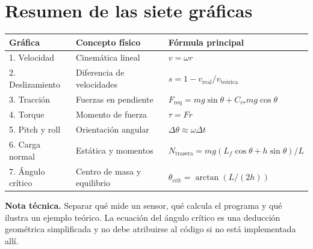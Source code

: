 \documentclass[12pt,a4paper]{article}
\begin{document}
\section*{Resumen de las siete gráficas}
\begin{center}
\begin{tabular}{lll}
\toprule
Gráfica & Concepto físico & Fórmula principal\\
\midrule
1. Velocidad & Cinemática lineal & \(v=\omega r\)\\
2. Deslizamiento & Diferencia de velocidades & \(s=1-v_{\mathrm{real}}/v_{\mathrm{teórica}}\)\\
3. Tracción & Fuerzas en pendiente & \(F_{\mathrm{req}}=mg\sin\theta+C_{rr}mg\cos\theta\)\\
4. Torque & Momento de fuerza & \(\tau=Fr\)\\
5. Pitch y roll & Orientación angular & \(\Delta\theta\approx\omega\Delta t\)\\
6. Carga normal & Estática y momentos & \(N_{\mathrm{trasera}}=mg(L_f\cos\theta+h\sin\theta)/L\)\\
7. Ángulo crítico & Centro de masa y equilibrio & \(\theta_{\mathrm{crit}}=\arctan(L/(2h))\)\\
\bottomrule
\end{tabular}
\end{center}

\textbf{Nota técnica.} Separar qué mide un sensor, qué calcula el programa y qué ilustra un ejemplo teórico. La ecuación del ángulo crítico es una deducción geométrica simplificada y no debe atribuirse al código si no está implementada allí.
\end{document}

